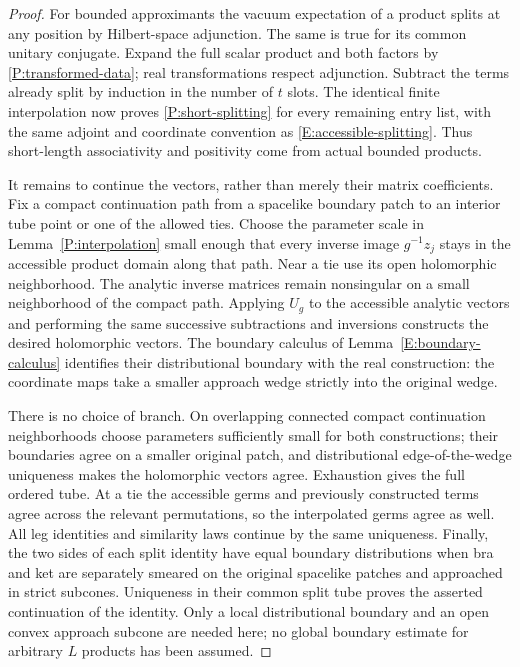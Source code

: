 \begin{proof}
For bounded approximants the vacuum expectation of a product splits at
any position by Hilbert-space adjunction.  The same is true for its
common unitary conjugate.  Expand the full scalar product and both
factors by \eqref{P:transformed-data}; real transformations respect
adjunction.  Subtract the terms already split by induction in the
number of $t$ slots.  The identical finite interpolation now proves
\eqref{P:short-splitting} for every remaining entry list, with the
same adjoint and coordinate convention as
\eqref{E:accessible-splitting}.  Thus short-length
associativity and positivity come from actual bounded products.

It remains to continue the vectors, rather than merely their matrix
coefficients.  Fix a compact continuation path from a spacelike
boundary patch to an interior tube point or one of the allowed ties.
Choose the parameter scale in Lemma~\ref{P:interpolation} small enough
that every inverse image $g^{-1}z_j$ stays in the accessible product
domain along that path.  Near a tie use its open holomorphic
neighborhood.  The analytic inverse matrices remain nonsingular on a
small neighborhood of the compact path.  Applying $U_g$ to the
accessible analytic vectors and performing the same successive
subtractions and inversions constructs the desired holomorphic
vectors.  The boundary calculus of
Lemma~\ref{E:boundary-calculus} identifies their distributional
boundary with the real construction: the coordinate maps take a
smaller approach wedge strictly into the original wedge.

There is no choice of branch.  On overlapping connected compact
continuation neighborhoods choose parameters sufficiently small for
both constructions; their boundaries agree on a smaller original
patch, and distributional edge-of-the-wedge uniqueness makes the
holomorphic vectors agree.  Exhaustion gives the full ordered tube.
At a tie the accessible germs and previously constructed terms agree
across the relevant permutations, so the interpolated germs agree as
well.  All leg identities and similarity laws continue by the same
uniqueness.  Finally, the two sides of each split identity have equal
boundary distributions when bra and ket are separately smeared on the
original spacelike patches and approached in strict subcones.
Uniqueness in their common split tube proves the asserted continuation
of the identity.  Only a local distributional boundary and an open
convex approach subcone are needed here; no global boundary estimate
for arbitrary $L$ products has been assumed.
\end{proof}

